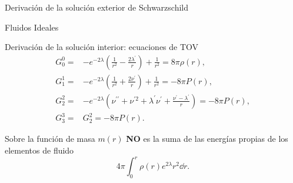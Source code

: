 \documentclass[11pt]{beamer}
\begin{document}
\begin{frame}[plain,noframenumbering,label=extsol]{Derivación de la solución exterior de Schwarzschild}
    
\end{frame}

\begin{frame}[plain,noframenumbering, label=idealfluid]{Fluidos Ideales}
    
\end{frame}

\begin{frame}[plain,noframenumbering,label=intsol]{Derivación de la solución interior: ecuaciones de TOV}
    \begin{align}
        G _ { 0 } ^ { 0 } =& -e ^ { - 2 \lambda } \left( \frac { 1 } { r ^ { 2 } } - \frac { 2 \lambda ^ { \prime } } { r } \right) + \frac { 1 } { r ^ { 2 } } = 8 \pi  \rho ( r ),  \\
         G _ { 1 } ^ { 1 } =& -e ^ { - 2 \lambda } \left( \frac { 1 } { r ^ { 2 } } + \frac { 2 \nu ^ { \prime } } { r } \right) + \frac { 1 } { r ^ { 2 } } = -8 \pi  P ( r ),  \\
         G _ { 2 } ^ { 2 } =& -e ^ { - 2 \lambda } \left( \nu ^ { \prime \prime } + \nu ^ { \prime 2 } + \lambda ^ { \prime } \nu ^ { \prime } + \frac { \nu ^ { \prime } - \lambda ^ { \prime } } { r } \right) = -8 \pi  P ( r ),  \\
          G _ { 3 } ^ { 3 } =& G _ { 2 } ^ { 2 } = -8 \pi  P ( r ).
    \end{align}
\end{frame}

\begin{frame}[plain,noframenumbering,label=masa]{Sobre la función de masa}
    $m(r)$ \textbf{NO} es la suma de las energías propias de los elementos de fluido
    \begin{equation}
        4 \pi \int _ { 0 } ^ { r } \rho ( r ) e^{2\lambda}r ^ { 2 }     \dd{r}.
    \end{equation}
\end{frame}
\end{document}
